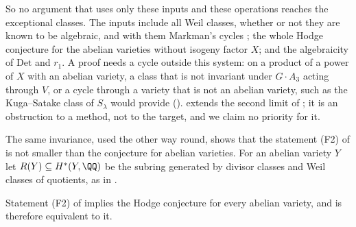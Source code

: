 So no argument that uses only these inputs and these operations reaches the
exceptional classes. The inputs include all Weil classes, whether or not they
are known to be algebraic, and with them Markman's cycles \cite{Mar25a}; the
whole Hodge conjecture for the abelian varieties without isogeny factor $X$;
and the algebraicity of $\mathrm{Det}$ and $r_{1}$. A proof needs a cycle
outside this system: on a product of a power of $X$ with an abelian variety, a
class that is not invariant under $G\cdot A_{3}$ acting through $V$, or a cycle
through a variety that is not an abelian variety, such as the Kuga--Satake
class of $S_{\lambda}$ would provide ().
 extends the second limit of
; it is an obstruction to a method, not to the
target, and we claim no priority for it.

The same invariance, used the other way round, shows that the statement (F2)
of  is not smaller than the conjecture for abelian
varieties. For an abelian variety $Y$ let $R(Y)\subseteq H^{*}(Y,\QQ)$ be the
subring generated by divisor classes and Weil classes of quotients, as in
.

\begin{proposition}
\label{prop:f2isab}
Statement \textup{(F2)} of  implies the Hodge
conjecture for every abelian variety, and is therefore equivalent to it.
\end{proposition}

